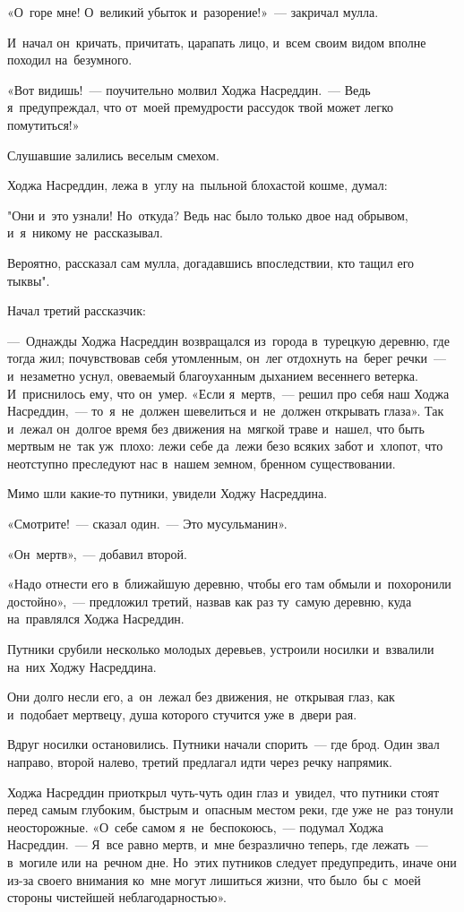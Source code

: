 \documentclass[12pt,a4paper]{book}
\begin{document}
«О~горе мне! О~великий убыток и~разорение!»~— закричал мулла.

И~начал он~кричать, причитать, царапать лицо, и~всем своим видом вполне походил на~безумного.

«Вот видишь!~— поучительно молвил Ходжа Насреддин.~— Ведь я~предупреждал, что от~моей премудрости рассудок твой может легко помутиться!»

Слушавшие залились веселым смехом.

Ходжа Насреддин, лежа в~углу на~пыльной блохастой кошме, думал:

"Они и~это узнали! Но~откуда? Ведь нас было только двое над обрывом, и~я~никому не~рассказывал.

Вероятно, рассказал сам мулла, догадавшись впоследствии, кто тащил его тыквы".

Начал третий рассказчик:

—~Однажды Ходжа Насреддин возвращался из~города в~турецкую деревню, где тогда жил; почувствовав себя утомленным, он~лег отдохнуть на~берег речки~— и~незаметно уснул, овеваемый благоуханным дыханием весеннего ветерка. И~приснилось ему, что он~умер. «Если я~мертв,~— решил про себя наш Ходжа Насреддин,~— то~я~не~должен шевелиться и~не~должен открывать глаза». Так и~лежал он~долгое время без движения на~мягкой траве и~нашел, что быть мертвым не~так уж~плохо: лежи себе да~лежи безо всяких забот и~хлопот, что неотступно преследуют нас в~нашем земном, бренном существовании.

Мимо шли какие-то путники, увидели Ходжу Насреддина.

«Смотрите!~— сказал один.~— Это мусульманин».

«Он~мертв»,~— добавил второй.

«Надо отнести его в~ближайшую деревню, чтобы его там обмыли и~похоронили достойно»,~— предложил третий, назвав как раз ту~самую деревню, куда на~правлялся Ходжа Насреддин.

Путники срубили несколько молодых деревьев, устроили носилки и~взвалили на~них Ходжу Насреддина.

Они долго несли его, а~он~лежал без движения, не~открывая глаз, как и~подобает мертвецу, душа которого стучится уже в~двери рая.

Вдруг носилки остановились. Путники начали спорить~— где брод. Один звал направо, второй налево, третий предлагал идти через речку напрямик.

Ходжа Насреддин приоткрыл чуть-чуть один глаз и~увидел, что путники стоят перед самым глубоким, быстрым и~опасным местом реки, где уже не~раз тонули неосторожные. «О~себе самом я~не~беспокоюсь,~— подумал Ходжа Насреддин.~— Я~все равно мертв, и~мне безразлично теперь, где лежать~— в~могиле или на~речном дне. Но~этих путников следует предупредить, иначе они из-за своего внимания ко~мне могут лишиться жизни, что было~бы с~моей стороны чистейшей неблагодарностью».
\end{document}
